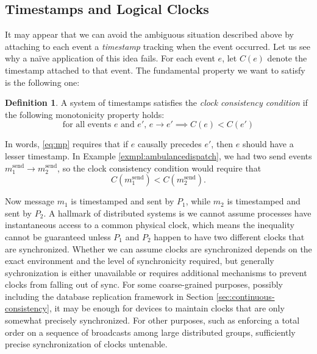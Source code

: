 \documentclass[]             %
{NASA}                       %
\theoremstyle{definition}
\newtheorem{definition}{Definition}[section]
\begin{document}
\subsection{Timestamps and Logical Clocks}
\label{ssec:timestamps}
It may appear that we can avoid the ambiguous situation described
above by attaching to each event a \emph{timestamp} tracking when the
event occurred. Let us see why a na\"ive application of this idea
fails. For each event $e$, let $C(e)$ denote the timestamp attached to
that event. The fundamental property we want to satisfy is the
following one:
\begin{definition}
  A system of timestamps satisfies the \emph{clock consistency
  condition} if the following monotonicity property holds:
  \[ \textrm{for all events $e$ and $e'$, } e \to e' \implies C(e) < C(e') \label{eq:mp}\tag{CC} \]
\end{definition}
In words, \ref{eq:mp} requires that if $e$ causally precedes $e'$,
then $e$ should have a lesser timestamp. In Example
\ref{exmpl:ambulancedispatch}, we had two send events
$m_1^\textrm{send} \to m_2^\textrm{send}$, so the clock consistency
condition would require that
\[C(m_1^\textrm{send}) < C(m_2^\textrm{send}).\]

Now message $m_1$ is timestamped and sent by $P_1$, while $m_2$ is
timestamped and sent by $P_2$. A hallmark of distributed systems is we
cannot assume processes have instantaneous access to a common physical
clock, which means the inequality cannot be guaranteed unless $P_1$
and $P_2$ happen to have two different clocks that are
synchronized. Whether we can assume clocks are synchronized depends on
the exact environment and the level of synchronicity required, but
generally sychronization is either unavailable or requires additional
mechanisms to prevent clocks from falling out of sync. For some
coarse-grained purposes, possibly including the database replication
framework in Section \ref{sec:continuous-consistency}, it may be
enough for devices to maintain clocks that are only somewhat precisely
synchronized. For other purposes, such as enforcing a total order on a
sequence of broadcasts among large distributed groups, sufficiently
precise synchronization of clocks untenable.
\end{document}
